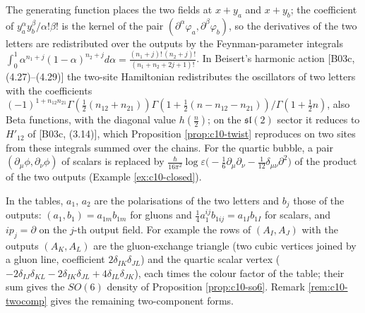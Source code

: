 \begin{remark}
The generating function places the two fields at $x+y_a$ and $x+y_b$; the coefficient of $y_a^\alpha y_b^\beta/\alpha!\beta!$ is the kernel of the pair $(\partial^\alpha\varphi_a,\partial^\beta\varphi_b)$, so the derivatives of the two letters are redistributed over the outputs by the Feynman-parameter integrals $\int_0^1\alpha^{n_1+j}(1-\alpha)^{n_2+j}d\alpha=\frac{(n_1+j)!\,(n_2+j)!}{(n_1+n_2+2j+1)!}$. In Beisert's harmonic action [B03c, (4.27)--(4.29)] the two-site Hamiltonian redistributes the oscillators of two letters with the coefficients $(-1)^{1+n_{12}n_{21}}\Gamma(\tfrac12(n_{12}+n_{21}))\Gamma(1+\tfrac12(n-n_{12}-n_{21}))/\Gamma(1+\tfrac12n)$, also Beta functions, with the diagonal value $h(\tfrac n2)$; on the $\mathfrak{sl}(2)$ sector it reduces to $H'_{12}$ of [B03c, (3.14)], which Proposition \ref{prop:c10-twist} reproduces on two sites from these integrals summed over the chains. For the quartic bubble, a pair $(\partial_\mu\phi,\partial_\nu\phi)$ of scalars is replaced by $\frac{\hbar}{16\pi^2}\log\varepsilon\big(-\tfrac16\partial_\mu\partial_\nu-\tfrac1{12}\delta_{\mu\nu}\partial^2\big)$ of the product of the two outputs (Example \ref{ex:c10-closed}).
\end{remark}

\begin{remark}
In the tables, $a_1$, $a_2$ are the polarisations of the two letters and $b_j$ those of the outputs: $(a_1,b_1)=a_{1m}b_{1m}$ for gluons and $\tfrac14a_1^{ij}b_{1ij}=a_{1I}b_{1I}$ for scalars, and $ip_j=\partial$ on the $j$-th output field. For example the rows of $(A_I,A_J)$ with the outputs $(A_K,A_L)$ are the gluon-exchange triangle (two cubic vertices joined by a gluon line, coefficient $2\delta_{IK}\delta_{JL}$) and the quartic scalar vertex ($-2\delta_{IJ}\delta_{KL}-2\delta_{IK}\delta_{JL}+4\delta_{IL}\delta_{JK}$), each times the colour factor of the table; their sum gives the $SO(6)$ density of Proposition \ref{prop:c10-so6}. Remark \ref{rem:c10-twocomp} gives the remaining two-component forms.
\end{remark}

